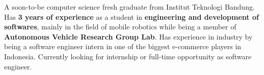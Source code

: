 

\begin{cvparagraph}
A soon-to-be computer science fresh graduate from Institut Teknologi Bandung. Has \textbf{3 years of experience} as a student in \textbf{engineering and development of softwares}, mainly in the field of mobile robotics while being a member of \textbf{Autonomous Vehicle Research Group Lab}. Has experience in industry by being a software engineer intern in one of the biggest e-commerce players in Indonesia. Currently looking for internship or full-time opportunity as software engineer.

\end{cvparagraph}
